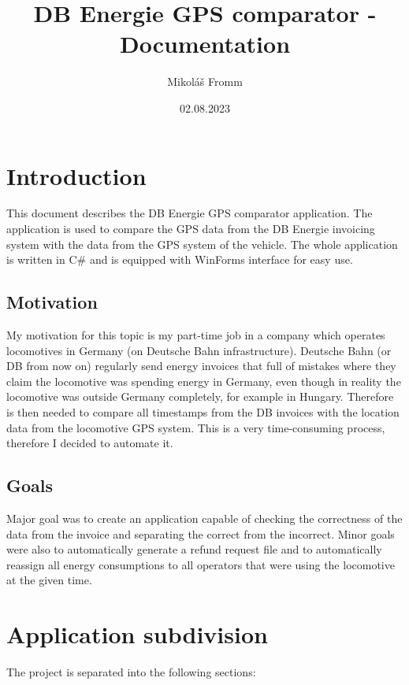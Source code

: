 \documentclass[11pt]{article}
\title{DB Energie GPS comparator - Documentation}
\author{Mikoláš Fromm}
\date{02.08.2023}
\begin{document}
\maketitle

\section{Introduction}

This document describes the DB Energie GPS comparator application. The application is used to compare the GPS data from the DB Energie invoicing system with the data from the GPS system of the vehicle. The whole application is written in C\# and is equipped with WinForms interface for easy use.

\subsection*{Motivation}

My motivation for this topic is my part-time job in a company which operates locomotives in Germany (on Deutsche Bahn infrastructure). Deutsche Bahn (or DB from now on) regularly send energy invoices that full of mistakes where they claim the locomotive was spending energy in Germany, even though in reality the locomotive was outside Germany completely, for example in Hungary. Therefore is then needed to compare all timestamps from the DB invoices with the location data from the locomotive GPS system. This is a very time-consuming process, therefore I decided to automate it.

\subsection*{Goals}
\label{sec:Goals}

Major goal was to create an application capable of checking the correctness of the data from the invoice and separating the correct from the incorrect. Minor goals were also to automatically generate a refund request file and to automatically reassign all energy consumptions to all operators that were using the locomotive at the given time.

\pagebreak

\section{Application subdivision}

The project is separated into the following sections:
\end{document}
